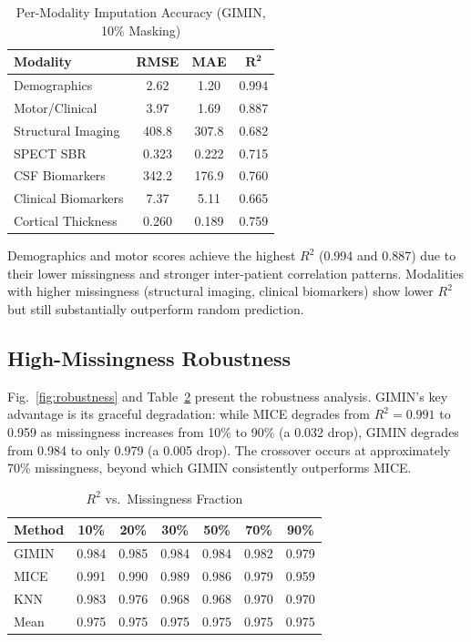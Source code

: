 \documentclass[journal,twoside,web]{ieeecolor}
\begin{document}
\begin{table}[t]
\centering
\caption{Per-Modality Imputation Accuracy (GIMIN, 10\% Masking)}
\label{tab:modality}
\begin{tabular}{lccc}
\toprule
\textbf{Modality} & \textbf{RMSE} & \textbf{MAE} & $\boldsymbol{R^2}$ \\
\midrule
Demographics       & 2.62   & 1.20   & 0.994 \\
Motor/Clinical     & 3.97   & 1.69   & 0.887 \\
Structural Imaging & 408.8  & 307.8  & 0.682 \\
SPECT SBR          & 0.323  & 0.222  & 0.715 \\
CSF Biomarkers     & 342.2  & 176.9  & 0.760 \\
Clinical Biomarkers & 7.37  & 5.11   & 0.665 \\
Cortical Thickness & 0.260  & 0.189  & 0.759 \\
\bottomrule
\end{tabular}
\end{table}

Demographics and motor scores achieve the highest $R^2$ (0.994 and 0.887) due to their lower missingness and stronger inter-patient correlation patterns. Modalities with higher missingness (structural imaging, clinical biomarkers) show lower $R^2$ but still substantially outperform random prediction.

\subsection{High-Missingness Robustness}

Fig.~\ref{fig:robustness} and Table~\ref{tab:robustness} present the robustness analysis. GIMIN's key advantage is its graceful degradation: while MICE degrades from $R^2 = 0.991$ to 0.959 as missingness increases from 10\% to 90\% (a 0.032 drop), GIMIN degrades from 0.984 to only 0.979 (a 0.005 drop). The crossover occurs at approximately 70\% missingness, beyond which GIMIN consistently outperforms MICE.

\begin{table}[t]
\centering
\caption{$R^2$ vs.\ Missingness Fraction}
\label{tab:robustness}
\begin{tabular}{lcccccc}
\toprule
\textbf{Method} & \textbf{10\%} & \textbf{20\%} & \textbf{30\%} & \textbf{50\%} & \textbf{70\%} & \textbf{90\%} \\
\midrule
GIMIN & 0.984 & 0.985 & 0.984 & 0.984 & 0.982 & 0.979 \\
MICE  & 0.991 & 0.990 & 0.989 & 0.986 & 0.979 & 0.959 \\
KNN   & 0.983 & 0.976 & 0.968 & 0.968 & 0.970 & 0.970 \\
Mean  & 0.975 & 0.975 & 0.975 & 0.975 & 0.975 & 0.975 \\
\bottomrule
\end{tabular}
\end{table}
\end{document}
